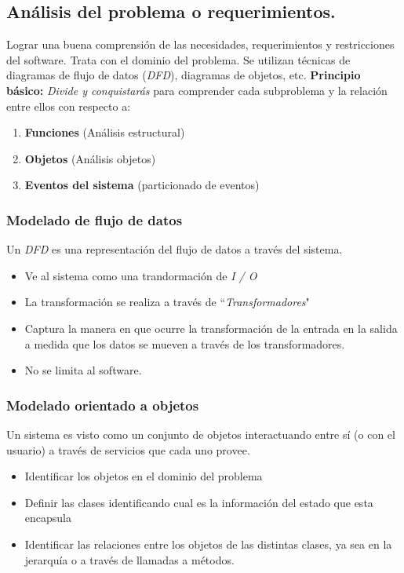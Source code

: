   \subsection{Análisis del problema o requerimientos.}

     Lograr una buena comprensión de las necesidades, requerimientos y restricciones del software. Trata
    con el dominio del problema. Se utilizan técnicas de diagramas de flujo de datos (\textit{DFD}), diagramas de
    objetos, etc.
    \PN \textbf{Principio básico:} \textit{Divide y conquistarás} para comprender cada subproblema y la
    relación entre ellos con respecto a:
    \begin{enumerate}[-]
      \item \textbf{Funciones} (Análisis estructural)
      \item \textbf{Objetos} (Análisis objetos)
      \item \textbf{Eventos del sistema} (particionado de eventos)
    \end{enumerate}

    \subsubsection{Modelado de flujo de datos}
      Un \textit{DFD} es una representación del flujo de datos a través del sistema.
      \begin{itemize}
        \item Ve al sistema como una trandormación de \textit{I / O}
        \item La transformación se realiza a través de ``\textit{Transformadores}"
        \item Captura la manera en que ocurre la transformación de la entrada en la salida a medida que los datos se
              mueven a través de los transformadores.
        \item No se limita al software.
      \end{itemize}

    \subsubsection{Modelado orientado a objetos}
      Un sistema es visto como un conjunto de objetos interactuando entre
      sí (o con el usuario) a través de servicios que cada uno provee.
      \PN{}
      \begin{itemize}
        \item Identificar los objetos en el dominio del problema
        \item Definir las clases identificando cual es la información del estado que esta encapsula
        \item Identificar las relaciones entre los objetos de las distintas clases, ya sea en la jerarquía o a través de
              llamadas a métodos.
      \end{itemize}

